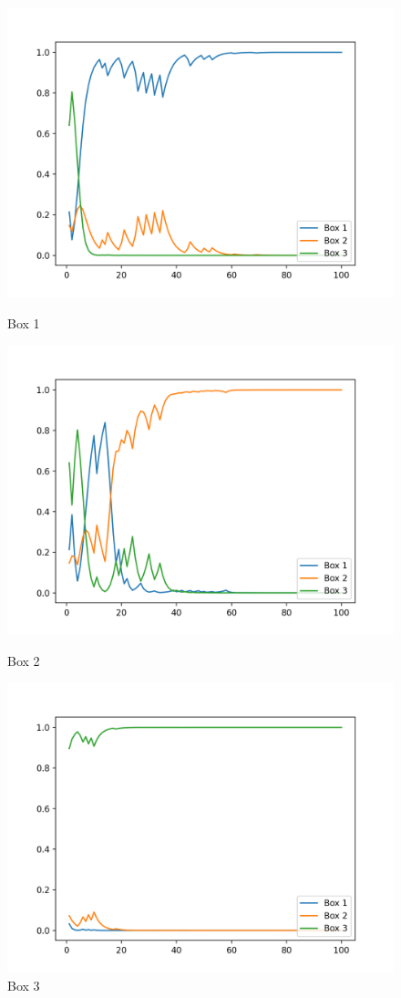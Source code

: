 \documentclass[12pt]{article}
\begin{document}
\begin{figure}[H]
  \includegraphics[width=\linewidth]{fig/fig_p27_1.png}
  \caption{Box 1}
\endminipage\hfill
{}
  \includegraphics[width=\linewidth]{fig/fig_p27_2.png}
  \caption{Box 2}
\endminipage\hfill
{}%
  \includegraphics[width=\linewidth]{fig/fig_p27_3.png}
  \caption{Box 3}
\endminipage
\end{figure}
\end{document}
